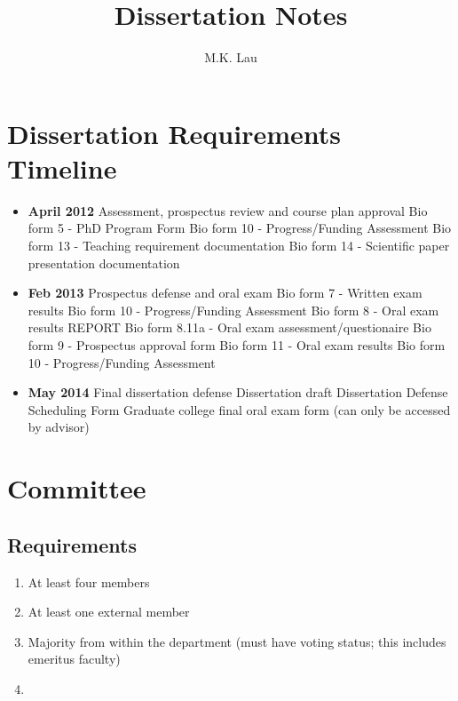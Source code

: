 \documentclass[12pt]{article}
\title{Dissertation Notes}
\author{M.K. Lau}
\begin{document}
\maketitle



\section*{Dissertation Requirements Timeline}

\begin{itemize}
\item \textbf{April 2012} Assessment, prospectus review and course plan approval
  \subitem Bio form 5 - PhD Program Form
  \subitem Bio form 10 - Progress/Funding Assessment
  \subitem Bio form 13 - Teaching requirement documentation
  \subitem Bio form 14 - Scientific paper presentation documentation
\item \textbf{Feb 2013} Prospectus defense and oral exam
  \subitem Bio form 7 - Written exam results
  \subitem Bio form 10 - Progress/Funding Assessment
  \subitem Bio form 8 - Oral exam results REPORT
  \subitem Bio form 8.11a - Oral exam assessment/questionaire
  \subitem Bio form 9 - Prospectus approval form
  \subitem Bio form 11 - Oral exam results
  \subitem Bio form 10 - Progress/Funding Assessment
\item \textbf{May 2014} Final dissertation defense
  \subitem Dissertation draft
  \subitem Dissertation Defense Scheduling Form
  \subitem Graduate college final oral exam form (can only be accessed
  by advisor)
\end{itemize}

\section*{Committee}
\subsection{Requirements}
\begin{enumerate}
\item At least four members
\item At least one external member
\item Majority from within the department (must have voting status;
  this includes emeritus faculty)
\item 
\end{enumerate}
\end{document}
